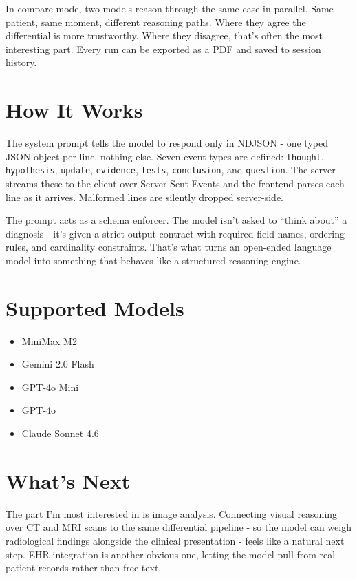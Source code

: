 \documentclass[11pt, a4paper]{article}
\begin{document}
In compare mode, two models reason through the same case in parallel. Same patient, same moment, different reasoning paths. Where they agree the differential is more trustworthy. Where they disagree, that's often the most interesting part. Every run can be exported as a PDF and saved to session history.

\section{How It Works}

The system prompt tells the model to respond only in NDJSON - one typed JSON object per line, nothing else. Seven event types are defined: \texttt{thought}, \texttt{hypothesis}, \texttt{update}, \texttt{evidence}, \texttt{tests}, \texttt{conclusion}, and \texttt{question}. The server streams these to the client over Server-Sent Events and the frontend parses each line as it arrives. Malformed lines are silently dropped server-side.

The prompt acts as a schema enforcer. The model isn't asked to ``think about'' a diagnosis - it's given a strict output contract with required field names, ordering rules, and cardinality constraints. That's what turns an open-ended language model into something that behaves like a structured reasoning engine.

\section{Supported Models}

\begin{itemize}
  \item MiniMax M2
  \item Gemini 2.0 Flash
  \item GPT-4o Mini
  \item GPT-4o
  \item Claude Sonnet 4.6
\end{itemize}

\section{What's Next}

The part I'm most interested in is image analysis. Connecting visual reasoning over CT and MRI scans to the same differential pipeline - so the model can weigh radiological findings alongside the clinical presentation - feels like a natural next step. EHR integration is another obvious one, letting the model pull from real patient records rather than free text.
\end{document}

